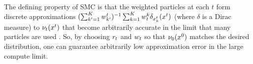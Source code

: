 
The defining property of SMC is that the weighted particles at each $t$ form discrete approximations
$(\sum_{k^\prime=1}^K w^{t}_{k^\prime})^{-1}\sum_{k=1}^K w_t^k \delta_{x^{t}_k} (x^{t})$  (where $\delta$ is a Dirac measure)
to $\nu_t (x^{t})$ that become arbitrarily accurate in the limit that many particles are used \citep[Proposition 11.4]{chopin2020introduction}.
So, by choosing $r_t$ and $w_t$ so that $\nu_0(x^{0})$ matches the desired distribution, one can guarantee arbitrarily low approximation error in the large compute limit.%




